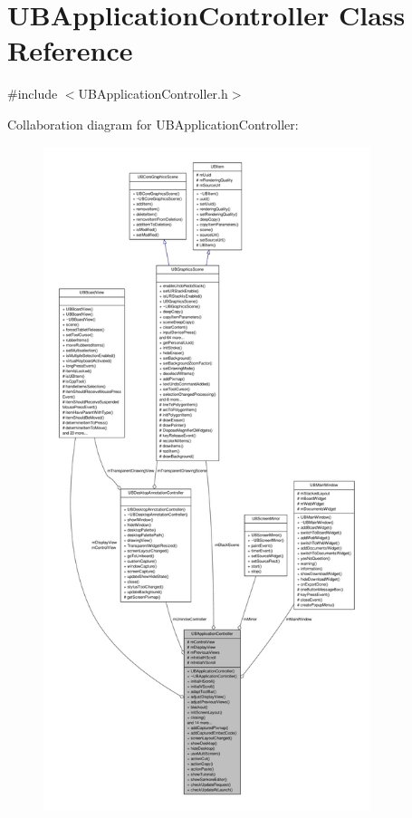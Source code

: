 \hypertarget{class_u_b_application_controller}{\section{U\-B\-Application\-Controller Class Reference}
\label{da/d14/class_u_b_application_controller}
}


{\ttfamily \#include $<$U\-B\-Application\-Controller.\-h$>$}



Collaboration diagram for U\-B\-Application\-Controller\-:
\nopagebreak
\begin{figure}[H]
\begin{center}
\leavevmode
\includegraphics[height=550pt]{d6/dff/class_u_b_application_controller__coll__graph}
\end{center}
\end{figure}
